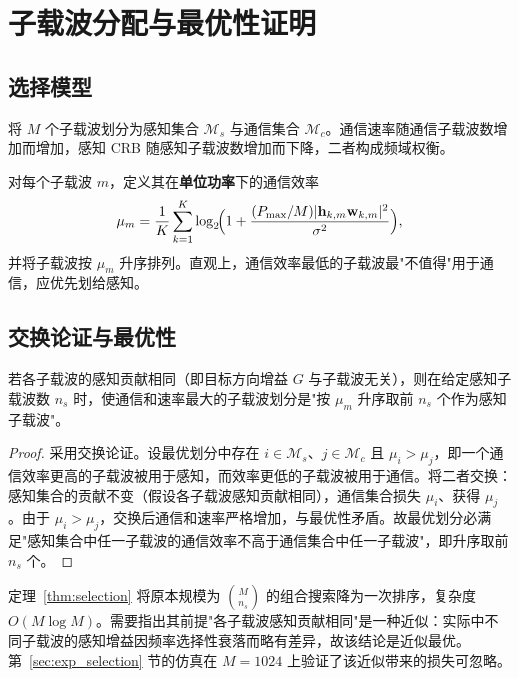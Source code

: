 \section{子载波分配与最优性证明}
\label{sec:subcarrier}

\subsection{选择模型}
\label{sec:selection}

将 $M$ 个子载波划分为感知集合 $\mathcal{M}_{s}$ 与通信集合 $\mathcal{M}_{c}$。通信速率随通信子载波数增加而增加，感知 CRB 随感知子载波数增加而下降，二者构成频域权衡。

对每个子载波 $m$，定义其在\textbf{单位功率}下的通信效率
\begin{equation}
  \mu_{m}=\frac{1}{K}\sum_{k=1}^{K}\log_2\!\Bigl(1+\frac{(P_{\max}/M)\lvert\mathbf{h}_{k,m}\mathbf{w}_{k,m}\rvert^{2}}{\sigma^{2}}\Bigr),
  \label{eq:mu}
\end{equation}
并将子载波按 $\mu_{m}$ 升序排列。直观上，通信效率最低的子载波最"不值得"用于通信，应优先划给感知。

\subsection{交换论证与最优性}
\label{sec:exchange}

\begin{theorem}[子载波选择的最优性]
\label{thm:selection}
若各子载波的感知贡献相同（即目标方向增益 $G$ 与子载波无关），则在给定感知子载波数 $n_{s}$ 时，使通信和速率最大的子载波划分是"按 $\mu_{m}$ 升序取前 $n_{s}$ 个作为感知子载波"。
\end{theorem}

\begin{proof}
采用交换论证。设最优划分中存在 $i\in\mathcal{M}_{s}$、$j\in\mathcal{M}_{c}$ 且 $\mu_{i}>\mu_{j}$，即一个通信效率更高的子载波被用于感知，而效率更低的子载波被用于通信。将二者交换：感知集合的贡献不变（假设各子载波感知贡献相同），通信集合损失 $\mu_{i}$、获得 $\mu_{j}$。由于 $\mu_{i}>\mu_{j}$，交换后通信和速率严格增加，与最优性矛盾。故最优划分必满足"感知集合中任一子载波的通信效率不高于通信集合中任一子载波"，即升序取前 $n_{s}$ 个。
\end{proof}

定理~\ref{thm:selection} 将原本规模为 $\binom{M}{n_{s}}$ 的组合搜索降为一次排序，复杂度 $O(M\log M)$。需要指出其前提"各子载波感知贡献相同"是一种近似：实际中不同子载波的感知增益因频率选择性衰落而略有差异，故该结论是近似最优。第~\ref{sec:exp_selection} 节的仿真在 $M=1024$ 上验证了该近似带来的损失可忽略。

